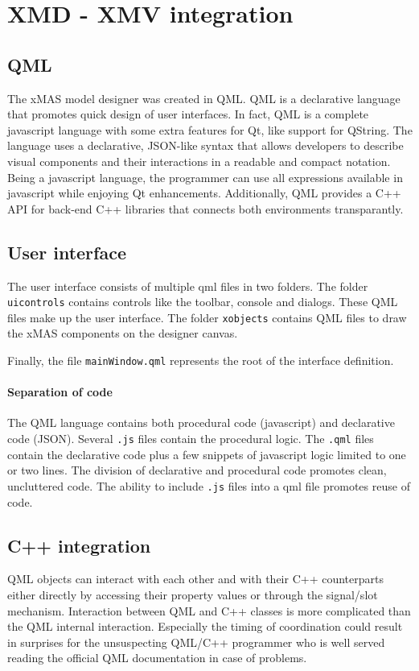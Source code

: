 \section{XMD - XMV integration}

\subsection{QML}

The xMAS model designer was created in QML. QML is a declarative language
that promotes quick design of user interfaces. In fact, QML is a complete javascript language
with some extra features for Qt, like support for {\sc QString}. 
The language uses a declarative, JSON-like syntax that allows developers to describe 
visual components and their interactions in a readable and compact notation. Being 
a javascript language, the programmer can use all expressions available
in javascript while enjoying Qt enhancements. 
Additionally, QML provides a C++ API for back-end C++ libraries that connects both environments
transparantly.

\subsection{User interface}

The user interface consists of multiple qml files in two folders.
The folder {\tt uicontrols} contains controls like the toolbar, 
console and dialogs. These QML files make up the user interface. 
The folder {\tt xobjects} contains QML files to draw the 
xMAS components on the designer canvas. 

Finally, the file {\tt mainWindow.qml} represents the root of the interface definition.

\paragraph{Separation of code}
The QML language contains both procedural code (javascript) and declarative code (JSON).
Several {\tt .js} files contain the procedural logic. The {\tt .qml} files contain
the declarative code plus a few snippets of javascript logic limited to one or two lines. 
The division of declarative and procedural code promotes clean, uncluttered code. 
The ability to include {\tt .js} files into a qml file promotes reuse of code.

\subsection{C++ integration}
QML objects can interact with each other and with their C++ counterparts 
either directly by accessing their property values or through the signal/slot mechanism. 
Interaction between QML and C++ classes is more complicated than the QML internal
interaction. Especially the timing of coordination could result in surprises for
the unsuspecting QML/C++ programmer who is well served reading the official QML documentation
in case of problems. 

